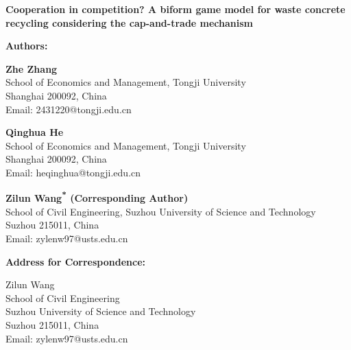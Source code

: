 \documentclass[12pt]{article}
\begin{document}
\pagestyle{empty}

\begin{center}
{\LARGE \textbf{Cooperation in competition? A biform game model for waste concrete recycling considering the cap-and-trade mechanism}}
\end{center}

\vspace{2em}

\noindent\textbf{Authors:}

\vspace{1em}

\noindent
\textbf{Zhe Zhang}\\
School of Economics and Management, Tongji University\\
Shanghai 200092, China\\
Email: 2431220@tongji.edu.cn

\vspace{1em}

\noindent
\textbf{Qinghua He}\\
School of Economics and Management, Tongji University\\
Shanghai 200092, China\\
Email: heqinghua@tongji.edu.cn

\vspace{1em}

\noindent
\textbf{Zilun Wang\textsuperscript{*} (Corresponding Author)}\\
School of Civil Engineering, Suzhou University of Science and Technology\\
Suzhou 215011, China\\
Email: zylenw97@usts.edu.cn

\vspace{2em}

\noindent\textbf{Address for Correspondence:}

\vspace{1em}

\noindent
Zilun Wang\\
School of Civil Engineering\\
Suzhou University of Science and Technology\\
Suzhou 215011, China\\
Email: zylenw97@usts.edu.cn
\end{document}
